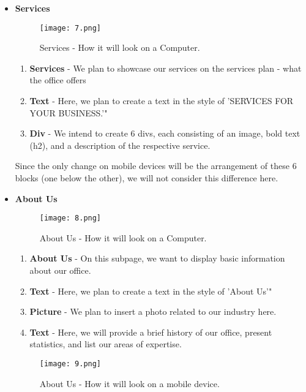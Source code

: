 \documentclass{article}
\begin{document}
\begin{itemize}
   \clearpage
    \item \textbf{Services} \par
   \begin{figure}[h]
    \centering
    \texttt{[image: 7.png]}
    \caption{Services - How it will look on a Computer.}
    \label{fig:enter-label}
\end{figure}
\begin{enumerate}
    \item \textbf{Services} - We plan to showcase our services on the services plan - what the office offers 
    \item \textbf{Text} - Here, we plan to create a text in the style of 'SERVICES FOR YOUR BUSINESS.'"
    \item \textbf{Div}  - We intend to create 6 divs, each consisting of an image, bold text (h2), and a description of the respective service.

\end{enumerate} 
    Since the only change on mobile devices will be the arrangement of these 6 blocks (one below the other), we will not consider this difference here.
    
\clearpage
    \item \textbf{About Us} \par
\begin{figure}[h]
    \centering
    \texttt{[image: 8.png]}
    \caption{About Us - How it will look on a Computer.}
    \label{fig:enter-label}
\end{figure}

\begin{enumerate}
    \item \textbf{About Us} - On this subpage, we want to display basic information about our office. 
    \item \textbf{Text} - Here, we plan to create a text in the style of 'About Us'"
    \item \textbf{Picture}  - We plan to insert a photo related to our industry here.
    \item \textbf{Text}  - Here, we will provide a brief history of our office, present statistics, and list our areas of expertise.
\end{enumerate} 
   \begin{figure}[h]
    \centering
    \texttt{[image: 9.png]}
    \caption{About Us - How it will look on a mobile device.}
    \label{fig:enter-label}
\end{figure}


\end{itemize}
\end{document}
